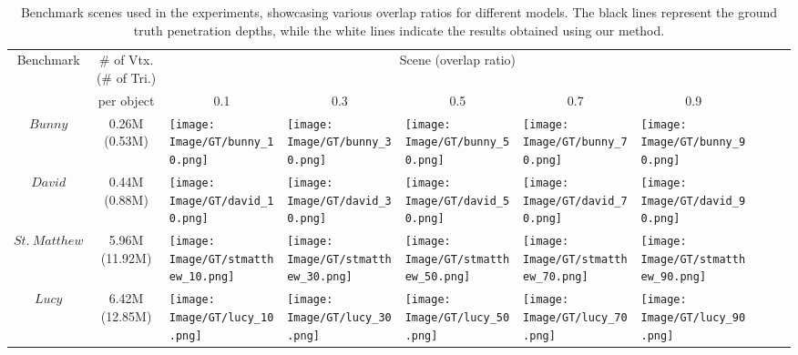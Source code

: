 \begin{table*}[]
\centering
\caption{Benchmark scenes used in the experiments, showcasing various overlap ratios for different models.
The black lines represent the ground truth penetration depths, while the white lines indicate the results obtained using our method.}
\label{table_bench}
\small
\begin{tabular}{@{}c|c|@{}m{2.7cm}@{ }m{2.7cm}@{ }m{2.7cm}@{ }m{2.7cm}@{ }m{2.7cm}@{ }m{2.7cm}@{ }m{2.7cm}@{ }m{2.7cm}@{}}
\hline
\multirow{2}{*}{Benchmark} & \# of Vtx. (\# of Tri.) & \multicolumn{5}{c}{Scene (overlap ratio)} \\  \cline{3-7}
    & per object              
    & \multicolumn{1}{c}{0.1}
    & \multicolumn{1}{c}{0.3}
    & \multicolumn{1}{c}{0.5}
    & \multicolumn{1}{c}{0.7}
    & \multicolumn{1}{c}{0.9}
    \\ \hline
{$Bunny$}                    & 0.26M (0.53M)           
    & \texttt{[image: Image/GT/bunny\_10.png]}   
    & \texttt{[image: Image/GT/bunny\_30.png]}       
    & \texttt{[image: Image/GT/bunny\_50.png]}        
    & \texttt{[image: Image/GT/bunny\_70.png]}        
    & \texttt{[image: Image/GT/bunny\_90.png]}       
    \\ \hline
{$David$}                     & 0.44M (0.88M)            
    & \texttt{[image: Image/GT/david\_10.png]}   
    & \texttt{[image: Image/GT/david\_30.png]}       
    & \texttt{[image: Image/GT/david\_50.png]}        
    & \texttt{[image: Image/GT/david\_70.png]}        
    & \texttt{[image: Image/GT/david\_90.png]}       
    \\ \hline
{$St.~Matthew$}                 & 5.96M (11.92M)          
    & \texttt{[image: Image/GT/stmatthew\_10.png]}   
    & \texttt{[image: Image/GT/stmatthew\_30.png]}       
    & \texttt{[image: Image/GT/stmatthew\_50.png]}        
    & \texttt{[image: Image/GT/stmatthew\_70.png]}        
    & \texttt{[image: Image/GT/stmatthew\_90.png]}       
    \\ \hline
{$Lucy$}                     & 6.42M (12.85M)          
    & \texttt{[image: Image/GT/lucy\_10.png]}   
    & \texttt{[image: Image/GT/lucy\_30.png]}       
    & \texttt{[image: Image/GT/lucy\_50.png]}        
    & \texttt{[image: Image/GT/lucy\_70.png]}        
    & \texttt{[image: Image/GT/lucy\_90.png]}       
    \\ \hline
\end{tabular}%
\end{table*}

